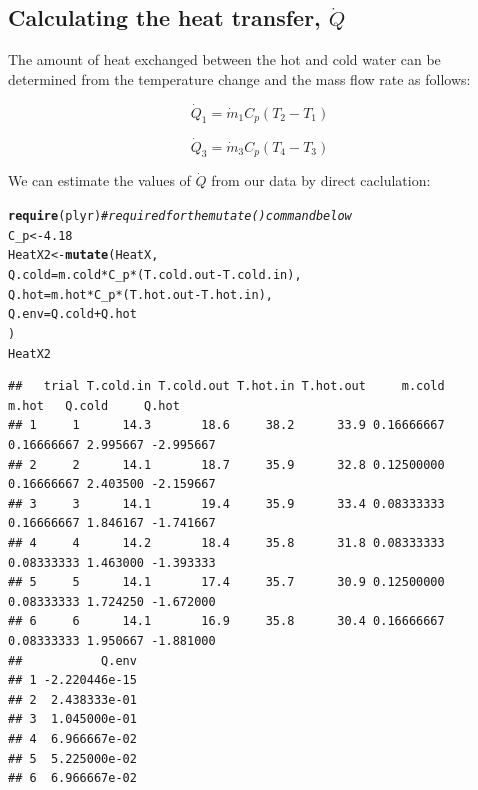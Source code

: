 \documentclass[twoside]{book}\usepackage[]{graphicx}\usepackage[]{xcolor}
\makeatletter
\newcommand{\hlnum}[1]{\textcolor[rgb]{0.686,0.059,0.569}{#1}}%
\newcommand{\hlcom}[1]{\textcolor[rgb]{0.678,0.584,0.686}{\textit{#1}}}%
\newcommand{\hlopt}[1]{\textcolor[rgb]{0,0,0}{#1}}%
\newcommand{\hlstd}[1]{\textcolor[rgb]{0.345,0.345,0.345}{#1}}%
\newcommand{\hlkwb}[1]{\textcolor[rgb]{0.69,0.353,0.396}{#1}}%
\newcommand{\hlkwc}[1]{\textcolor[rgb]{0.333,0.667,0.333}{#1}}%
\newcommand{\hlkwd}[1]{\textcolor[rgb]{0.737,0.353,0.396}{\textbf{#1}}}%
\newenvironment{kframe}{%
 \def\at@end@of@kframe{}%
 \ifinner\ifhmode%
  \def\at@end@of@kframe{\end{minipage}}%
  \begin{minipage}{\columnwidth}%
 \fi\fi%
 \def\FrameCommand##1{\hskip\@totalleftmargin \hskip-\fboxsep
 \colorbox{shadecolor}{##1}\hskip-\fboxsep
     \hskip-\linewidth \hskip-\@totalleftmargin \hskip\columnwidth}%
 \MakeFramed {\advance\hsize-\width
   \@totalleftmargin\z@ \linewidth\hsize
   \@setminipage}}%
 {\par\unskip\endMakeFramed%
 \at@end@of@kframe}
\newenvironment{knitrout}{}{} %
\makeatother
\begin{document}

\subsection{Calculating the heat transfer, $\dot Q$}

The amount of heat exchanged between the hot and cold water can be determined
from the temperature change and the mass flow rate as follows:

\begin{equation}
    \dot{Q}_{1} = \dot{m}_{1} C_{p} (T_{2} - T_{1})
\end{equation}

\begin{equation}
    \dot{Q}_{3} = \dot{m}_{3} C_{p} (T_{4} - T_{3})
\end{equation}

We can estimate the values of $\dot{Q}$ from our data by direct caclulation:
\begin{knitrout}
\color{fgcolor}\begin{kframe}
\begin{alltt}
\hlkwd{require}\hlstd{(plyr)}                 \hlcom{# required for the mutate() command below}
\hlstd{C_p} \hlkwb{<-} \hlnum{4.18}
\hlstd{HeatX2} \hlkwb{<-} \hlkwd{mutate}\hlstd{(HeatX,}
                 \hlkwc{Q.cold} \hlstd{= m.cold} \hlopt{*} \hlstd{C_p} \hlopt{*} \hlstd{(T.cold.out} \hlopt{-} \hlstd{T.cold.in),}
                 \hlkwc{Q.hot}\hlstd{= m.hot} \hlopt{*} \hlstd{C_p} \hlopt{*} \hlstd{(T.hot.out}\hlopt{-} \hlstd{T.hot.in),}
                 \hlkwc{Q.env} \hlstd{= Q.cold} \hlopt{+} \hlstd{Q.hot}
\hlstd{)}
\hlstd{HeatX2}
\end{alltt}
\begin{verbatim}
##   trial T.cold.in T.cold.out T.hot.in T.hot.out     m.cold      m.hot   Q.cold     Q.hot
## 1     1      14.3       18.6     38.2      33.9 0.16666667 0.16666667 2.995667 -2.995667
## 2     2      14.1       18.7     35.9      32.8 0.12500000 0.16666667 2.403500 -2.159667
## 3     3      14.1       19.4     35.9      33.4 0.08333333 0.16666667 1.846167 -1.741667
## 4     4      14.2       18.4     35.8      31.8 0.08333333 0.08333333 1.463000 -1.393333
## 5     5      14.1       17.4     35.7      30.9 0.12500000 0.08333333 1.724250 -1.672000
## 6     6      14.1       16.9     35.8      30.4 0.16666667 0.08333333 1.950667 -1.881000
##           Q.env
## 1 -2.220446e-15
## 2  2.438333e-01
## 3  1.045000e-01
## 4  6.966667e-02
## 5  5.225000e-02
## 6  6.966667e-02
\end{verbatim}
\end{kframe}
\end{knitrout}
\end{document}
